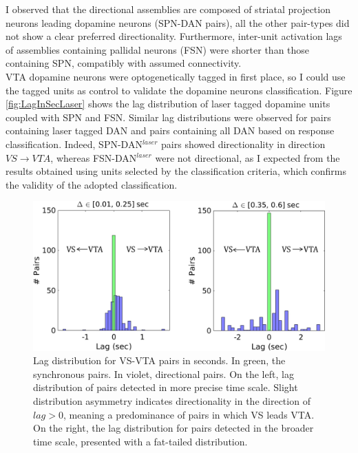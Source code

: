  I observed that the directional assemblies are composed of striatal projection neurons leading dopamine neurons (SPN-DAN pairs), all the other pair-types did not show a clear preferred directionality. Furthermore, inter-unit activation lags of assemblies containing pallidal neurons (FSN) were shorter than those containing SPN, compatibly with assumed connectivity.\\VTA dopamine neurons were optogenetically tagged in first place, so I could use the tagged units as control to validate the dopamine neurons classification. Figure \ref{fig:LagInSecLaser} shows the lag distribution of laser tagged dopamine units coupled with SPN and FSN. Similar lag distributions were observed for pairs containing laser tagged DAN and pairs containing all DAN based on response classification. Indeed, SPN-DAN$^{laser}$ pairs showed directionality in direction $VS\rightarrow VTA$, whereas FSN-DAN$^{laser}$ were not directional, as I expected from the results obtained using units selected by the classification criteria, which confirms the validity of the adopted classification.\\
\begin{figure}[H]
\centering
\includegraphics[scale=0.58]{figures/LagGeneral1.pdf}
\caption{Lag distribution for VS-VTA pairs in seconds. In green, the synchronous pairs. In violet, directional pairs. On the left, lag distribution of pairs detected in more precise time scale. Slight distribution asymmetry indicates directionality in the direction of $lag > 0$, meaning a predominance of pairs in which VS leads VTA. On the right, the lag distribution for pairs detected in the broader time scale, presented with a fat-tailed distribution.}
\label{fig:LagInSecAll}
\end{figure}
